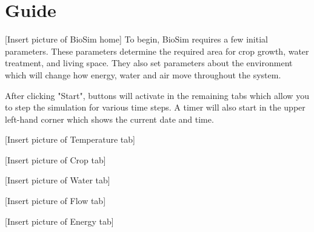 \part{Guide}
[Insert picture of BioSim home]
To begin, BioSim requires a few initial parameters. These parameters determine the required area for crop growth, water treatment, and living space. They also set parameters about the environment which will change how energy, water and air move throughout the system. 

After clicking "Start", buttons will activate in the remaining tabs which allow you to step the simulation for various time steps. A timer will also start in the upper left-hand corner which shows the current date and time.

[Insert picture of Temperature tab]

[Insert picture of Crop tab]

[Insert picture of Water tab]

[Insert picture of Flow tab]

[Insert picture of Energy tab]